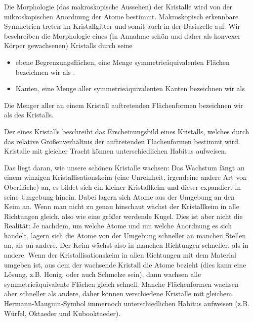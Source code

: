 

Die Morphologie (das makroskopische Aussehen) der Kristalle wird von der mikroskopischen Anordnung der Atome bestimmt. Makroskopisch erkennbare Symmetrien treten im Kristallgitter und somit auch in der Basiszelle auf. Wir beschreiben die Morphologie eines (in Annahme schön und daher als konvexer Körper gewachsenen) Kristalls durch seine
\begin{itemize}
	\item ebene Begrenzungsflächen, eine Menge symmetrieäquivalenten Flächen bezeichnen wir als . 
	\item Kanten, eine Menge aller symmetrieäquivalenten Kanten bezeichnen wir als 
\end{itemize}

\begin{definition}
	Die Menger aller an einem Kristall auftretenden Flächenformen bezeichnen wir als  des Kristalls.
\end{definition}
\begin{definition}
	Der  eines Kristalls beschreibt das Erscheinungsbild eines Kristalls, welches durch das  relative Größenverhältnis der auftretenden Flächenformen bestimmt wird.
	Kristalle mit gleicher Tracht können unterschiedlichen Habitus aufweisen. 
\end{definition}

Das liegt daran, wie unsere schönen Kristalle wachsen: Das Wachstum fängt an einem winzigen Kristallisationskeim (eine Unreinheit, irgendeine andere Art von Oberfläche) an, es bildet sich ein kleiner Kristallkeim und dieser expandiert in seine Umgebung hinein. Dabei lagern sich Atome aus der Umgebung an den Keim an. Wenn man nicht zu genau hinschaut wächst der Kristallkeim in alle Richtungen gleich, also wie eine größer werdende Kugel. Dies ist aber nicht die Realität: Je nachdem, um welche Atome und um welche Anordnung es sich handelt, lagern sich die Atome von der Umgebung schneller an manchen Stellen an, als an andere. Der Keim wächst also in manchen Richtungen schneller, als in andere. Wenn der Kristallisationskeim in allen Richtungen mit dem Material umgeben ist, aus dem der wachsende Kristall die Atome bezieht (dies kann eine Lösung, z.B. Honig, oder auch Schmelze sein), dann wachsen alle symmetrieäquivalente Flächen gleich schnell. Manche Flächenformen wachsen aber schneller als andere, daher können verschiedene Kristalle mit gleichem Hermann-Mauguin-Symbol immernoch unterschiedlichen Habitus aufweisen (z.B. Würfel, Oktaeder und Kubooktaeder).


